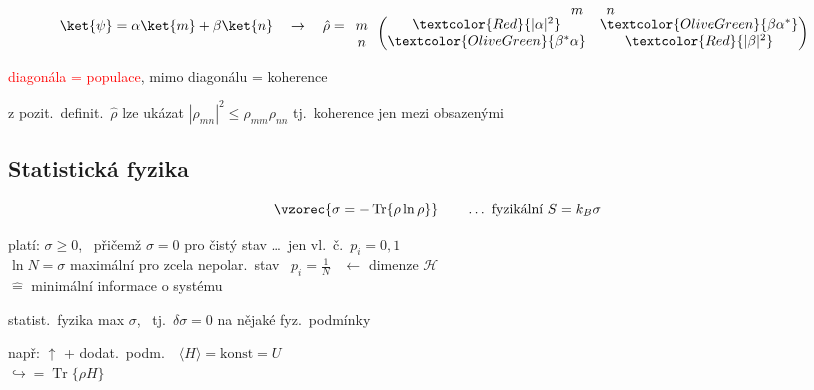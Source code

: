 \begin{minipage}{0.62\textwidth}
\[
  \ket{\psi} = \alpha\ket{m} + \beta\ket{n} \quad\to\quad
  \hat\rho = \begin{array}{c}\\ m\\ n\end{array}\!\!
  \begin{array}{c} \begin{array}{cc} m & \ \ n \end{array}\\[-2pt]
  \begin{pmatrix} \textcolor{Red}{|\alpha|^2} & \textcolor{OliveGreen}{\beta\alpha^*} \\ \textcolor{OliveGreen}{\beta^*\alpha} & \textcolor{Red}{|\beta|^2}\end{pmatrix}\end{array}
\]
\end{minipage}
\begin{minipage}{0.36\textwidth}
\small \textcolor{Red}{diagonála = populace}, \textcolor{OliveGreen}{mimo diagonálu = koherence} \\
\end{minipage}

z pozit.\ definit.\ $\hat\rho$ lze ukázat \quad $|\rho_{mn}|^2 \leq \rho_{mm}\rho_{nn}$ \quad tj.\ koherence jen mezi obsazenými

\subsection*{Statistická fyzika}
\begin{definice}
\[
  \vzorec{\sigma = -\operatorname{Tr}\{\rho\ln\rho\}} \qquad\dots\ \text{fyzikální } S = k_B\sigma
\]
\end{definice}
platí: \quad $\sigma\geq 0$, \ přičemž $\sigma = 0$ pro čistý stav \dots\ jen vl.\ č.\ $p_i = 0,1$ \\
\phantom{platí:} \quad $\ln N = \sigma$ maximální pro zcela nepolar.\ stav \ $p_i = \frac1N$ \ $\leftarrow$ dimenze $\mathcal{H}$ \\
\phantom{platí:} \quad $\hat=$ minimální informace o systému

statist.\ fyzika \quad max $\sigma$, \ tj.\ $\delta\sigma = 0$ na nějaké fyz.\ podmínky

např: \quad {} \quad $\uparrow$ + dodat.\ podm.\ \ $\langle H\rangle = \text{konst} = U$ \\
\hspace*{8.1cm} $\hookrightarrow = \operatorname{Tr}\{\rho H\}$

